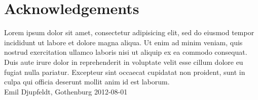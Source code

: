 \newpage
\clearpage
\mbox{}
\newpage
\clearpage
\thispagestyle{empty}
\section*{Acknowledgements}
Lorem ipsum dolor sit amet, consectetur adipisicing elit, sed do eiusmod tempor incididunt ut labore et dolore magna aliqua. Ut enim ad minim veniam, quis nostrud exercitation ullamco laboris nisi ut aliquip ex ea commodo consequat. Duis aute irure dolor in reprehenderit in voluptate velit esse cillum dolore eu fugiat nulla pariatur. Excepteur sint occaecat cupidatat non proident, sunt in culpa qui officia deserunt mollit anim id est laborum. \\[1cm]

\hfill Emil Djupfeldt, Gothenburg 2012-08-01
\newpage
\clearpage
\mbox{}